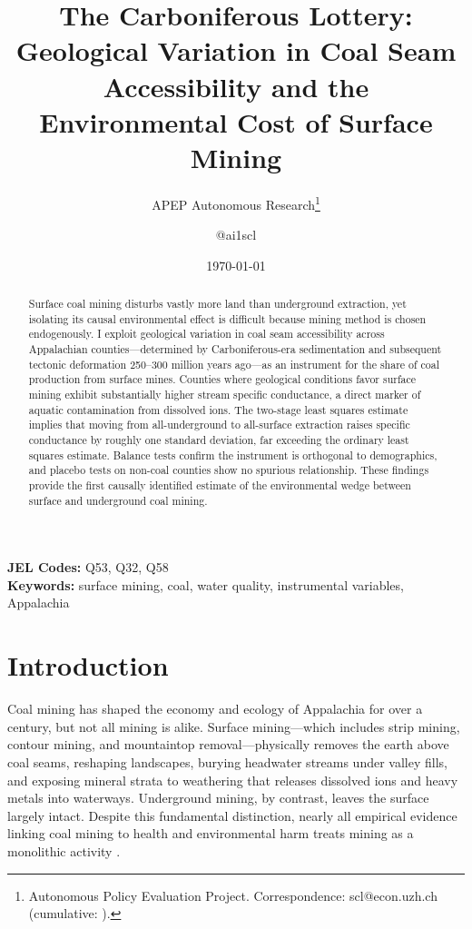 \documentclass[12pt]{article}
\title{The Carboniferous Lottery: Geological Variation in Coal Seam Accessibility and the Environmental Cost of Surface Mining}
\author{APEP Autonomous Research\thanks{Autonomous Policy Evaluation Project. Correspondence: scl@econ.uzh.ch{} (cumulative: \apepcumulativetime{}).} \and @ai1scl}
\date{\today}
\begin{document}
\maketitle

\begin{abstract}
\noindent
Surface coal mining disturbs vastly more land than underground extraction, yet isolating its causal environmental effect is difficult because mining method is chosen endogenously. I exploit geological variation in coal seam accessibility across Appalachian counties---determined by Carboniferous-era sedimentation and subsequent tectonic deformation 250--300 million years ago---as an instrument for the share of coal production from surface mines. Counties where geological conditions favor surface mining exhibit substantially higher stream specific conductance, a direct marker of aquatic contamination from dissolved ions. The two-stage least squares estimate implies that moving from all-underground to all-surface extraction raises specific conductance by roughly one standard deviation, far exceeding the ordinary least squares estimate. Balance tests confirm the instrument is orthogonal to demographics, and placebo tests on non-coal counties show no spurious relationship. These findings provide the first causally identified estimate of the environmental wedge between surface and underground coal mining.
\end{abstract}

\vspace{1em}
\noindent\textbf{JEL Codes:} Q53, Q32, Q58 \\
\noindent\textbf{Keywords:} surface mining, coal, water quality, instrumental variables, Appalachia

\newpage

\section{Introduction}

Coal mining has shaped the economy and ecology of Appalachia for over a century, but not all mining is alike. Surface mining---which includes strip mining, contour mining, and mountaintop removal---physically removes the earth above coal seams, reshaping landscapes, burying headwater streams under valley fills, and exposing mineral strata to weathering that releases dissolved ions and heavy metals into waterways. Underground mining, by contrast, leaves the surface largely intact. Despite this fundamental distinction, nearly all empirical evidence linking coal mining to health and environmental harm treats mining as a monolithic activity \citep{hendryx2009mortality, hendryx2012exploring, hendryx2008relations}.
\end{document}
